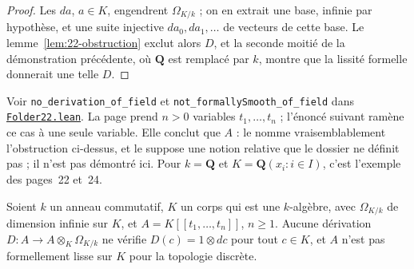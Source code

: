 \begin{proof}
Les $da$, $a \in K$, engendrent $\Omega_{K/k}$ ; on en extrait une base, infinie par hypothèse, et une suite injective $da_0, da_1, \ldots$ de vecteurs de cette base. Le lemme~\ref{lem:22-obstruction} exclut alors $D$, et la seconde moitié de la démonstration précédente, où $\mathbf Q$ est remplacé par $k$, montre que la lissité formelle donnerait une telle $D$.
\end{proof}

\begingroup\raggedright
\noindent Voir \texttt{no\_derivation\_of\_field} et \texttt{not\_formallySmooth\_of\_field} dans \href{\leanblob/RingTheory/Folder22.lean}{\texttt{Folder22.\allowbreak{}lean}}. La page prend $n > 0$ variables $t_1, \ldots, t_n$ ; l'énoncé suivant ramène ce cas à une seule variable. Elle conclut que $A$  : le  nomme vraisemblablement l'obstruction ci-dessus, et le  suppose une notion relative que le dossier ne définit pas ; il n'est pas démontré ici. Pour $k = \mathbf Q$ et $K = \mathbf Q(x_i : i \in I)$, c'est l'exemple des pages~22 et~24.\par\endgroup

\begin{encadre}
\begin{theoreme}
Soient $k$ un anneau commutatif, $K$ un corps qui est une $k$-algèbre, avec $\Omega_{K/k}$ de dimension infinie sur $K$, et $A = K[[t_1, \ldots, t_n]]$, $n \geq 1$. Aucune dérivation $D : A \to A \otimes_K \Omega_{K/k}$ ne vérifie $D(c) = 1 \otimes dc$ pour tout $c \in K$, et $A$ n'est pas formellement lisse sur $K$ pour la topologie discrète.
\end{theoreme}
\end{encadre}

